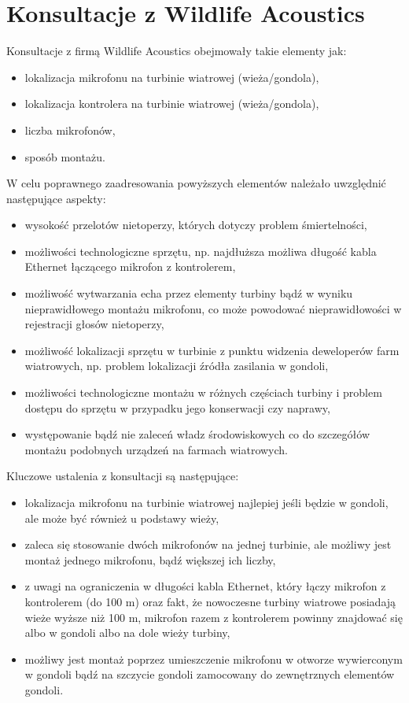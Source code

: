 \documentclass{sprz}
\begin{document}
\section{Konsultacje z Wildlife Acoustics}
Konsultacje z firmą Wildlife Acoustics obejmowały takie elementy jak:
\begin{itemize}
  \item{lokalizacja mikrofonu na turbinie wiatrowej (wieża/gondola),}
  \item{lokalizacja kontrolera na turbinie wiatrowej (wieża/gondola),}
  \item{liczba mikrofonów,}
  \item{sposób montażu.}
\end{itemize}

W celu poprawnego zaadresowania powyższych elementów należało uwzględnić następujące aspekty:

\begin{itemize}
  \item{wysokość przelotów nietoperzy, których dotyczy problem śmiertelności,}
  \item{możliwości technologiczne sprzętu, np. najdłuższa możliwa długość kabla Ethernet łączącego mikrofon z kontrolerem,}
  \item{możliwość wytwarzania echa przez elementy turbiny bądź w wyniku nieprawidłowego montażu mikrofonu, co może powodować nieprawidłowości w rejestracji głosów nietoperzy,}
  \item{możliwość lokalizacji sprzętu w turbinie z punktu widzenia deweloperów farm wiatrowych, np. problem lokalizacji źródła zasilania w gondoli,}
  \item {możliwości technologiczne montażu w różnych częściach turbiny i problem dostępu do sprzętu w przypadku jego konserwacji czy naprawy,}
  \item {występowanie bądź nie zaleceń władz środowiskowych co do szczegółów montażu podobnych urządzeń na farmach wiatrowych.}
\end{itemize}

Kluczowe ustalenia z konsultacji są następujące:
\begin{itemize}
  \item{lokalizacja mikrofonu na turbinie wiatrowej najlepiej jeśli będzie w gondoli, ale może być również u podstawy wieży,}
  \item{zaleca się stosowanie dwóch mikrofonów na jednej turbinie, ale możliwy jest montaż jednego mikrofonu, bądź większej ich liczby,}
  \item{z uwagi na ograniczenia w długości kabla Ethernet, który łączy mikrofon z kontrolerem (do 100 m) oraz fakt, że nowoczesne turbiny wiatrowe posiadają wieże wyższe niż 100 m, mikrofon razem z kontrolerem powinny znajdować się albo w gondoli albo na dole wieży turbiny,}
  \item{możliwy jest montaż poprzez umieszczenie mikrofonu w otworze wywierconym w gondoli bądź na szczycie gondoli zamocowany do zewnętrznych elementów gondoli.}
\end{itemize}
\end{document}
